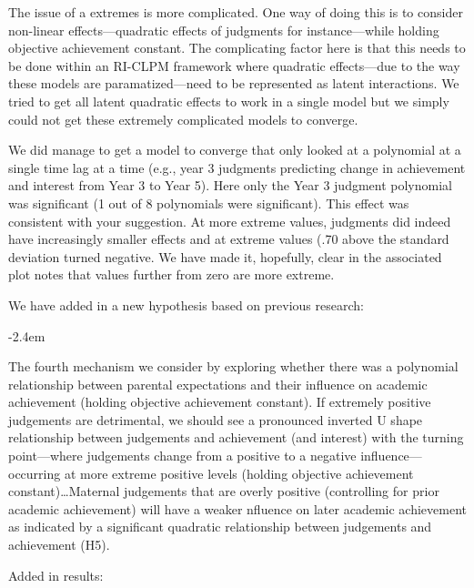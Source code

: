 \documentclass[]{article}
\renewenvironment{quote}{\begin{fquote}\advance\leftmargini -2.4em\begin{oldquote}}{\end{oldquote}\end{fquote}}
\newenvironment{fquote}
  {\def\FrameCommand{
	\fboxsep=0.6em %
	\fcolorbox{black}{white}}%
    \MakeFramed {\advance\hsize-2\width \FrameRestore}
    \begin{minipage}{\linewidth}
  }
  {\end{minipage}\endMakeFramed}
\begin{document}
The issue of a extremes is more complicated. One way of doing this is to consider non-linear effects---quadratic effects of judgments for instance---while holding objective achievement constant. The complicating factor here is that this needs to be done within an RI-CLPM framework where quadratic effects---due to the way these models are paramatized---need to be represented as latent interactions. We tried to get all latent quadratic effects to work in a single model but we simply could not get these extremely complicated models to converge.

We did manage to get a model to converge that only looked at a polynomial at a single time lag at a time (e.g., year 3 judgments predicting change in achievement and interest from Year 3 to Year 5). Here only the Year 3 judgment polynomial was significant (1 out of 8 polynomials were significant). This effect was consistent with your suggestion. At more extreme values, judgments did indeed have increasingly smaller effects and at extreme values (.70 above the standard deviation turned negative. We have made it, hopefully, clear in the associated plot notes that values further from zero are more extreme.

We have added in a new hypothesis based on previous research:

\begin{quote}
The fourth mechanism we consider by exploring whether there was a polynomial relationship between parental expectations and their influence on academic achievement (holding objective achievement constant). If extremely positive judgements are detrimental, we should see a pronounced inverted U shape relationship between judgements and achievement (and interest) with the turning point---where judgements change from a positive to a negative influence---occurring at more extreme positive levels (holding objective achievement constant)\ldots Maternal judgements that are overly positive (controlling for prior academic achievement) will have a weaker nfluence on later academic achievement as indicated by a significant quadratic relationship between judgements and achievement (H5).
\end{quote}

Added in results:
\end{document}
